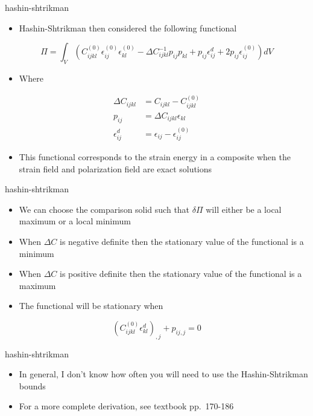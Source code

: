 \documentclass[
  letterpaper,
  ignorenonframetext,
  aspectratio=43,
  handout,
  12pt]{beamer}
\providecommand{\tightlist}{%
  \setlength{\itemsep}{0pt}\setlength{\parskip}{0pt}}
\providecommand{\tightlist}{%
\setlength{\itemsep}{0pt}\setlength{\parskip}{0pt}}
\begin{document}
\begin{frame}{hashin-shtrikman}
\protect\hypertarget{hashin-shtrikman-1}{}
\begin{itemize}
\tightlist
\item
  Hashin-Shtrikman then considered the following functional
\end{itemize}

\[ \Pi = \int_V (C_{ijkl}^{(0)}\epsilon_{ij}^{(0)}\epsilon_{kl}^{(0)} - \Delta C_{ijkl}^{-1}p_{ij}p_{kl} + p_{ij}\epsilon_{ij}^d + 2p_{ij}\epsilon_{ij}^{(0)})dV
\]

\begin{itemize}
\tightlist
\item
  Where
\end{itemize}

\[\begin{aligned}
  \Delta C_{ijkl} &= C_{ijkl} - C^{(0)}_{ijkl}\\
  p_{ij} &= \Delta C_{ijkl} \epsilon_{kl}\\
  \epsilon_{ij}^d &= \epsilon_{ij} - \epsilon_{ij}^{(0)}
\end{aligned}\]

\begin{itemize}
\tightlist
\item
  This functional corresponds to the strain energy in a composite when
  the strain field and polarization field are exact solutions
\end{itemize}
\end{frame}

\begin{frame}{hashin-shtrikman}
\protect\hypertarget{hashin-shtrikman-2}{}
\begin{itemize}
\tightlist
\item
  We can choose the comparison solid such that \(\delta \Pi\) will
  either be a local maximum or a local minimum
\item
  When \(\Delta C\) is negative definite then the stationary value of
  the functional is a minimum
\item
  When \(\Delta C\) is positive definite then the stationary value of
  the functional is a maximum
\item
  The functional will be stationary when
\end{itemize}

\[ \left ( C_{ijkl}^{(0)} \epsilon^d_{kl}\right)_{,j} + p_{ij,j} = 0 \]
\end{frame}

\begin{frame}{hashin-shtrikman}
\protect\hypertarget{hashin-shtrikman-3}{}
\begin{itemize}
\tightlist
\item
  In general, I don't know how often you will need to use the
  Hashin-Shtrikman bounds
\item
  For a more complete derivation, see textbook pp.~170-186
\end{itemize}
\end{frame}
\end{document}
